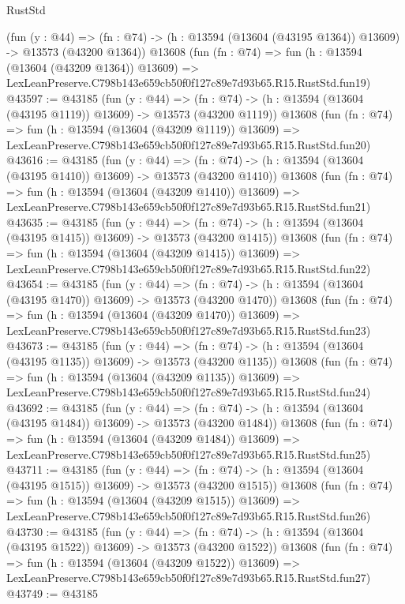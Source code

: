 \begin{lexlean}{RustStd}
\begin{coremodule}
    (fun (y : @44) =>
    (fn : @74) -> (h : @13594 (@13604 (@43195 @1364)) @13609) -> @13573 (@43200 @1364))
    @13608
    (fun (fn : @74) =>
    fun (h : @13594 (@13604 (@43209 @1364)) @13609) =>
    LexLeanPreserve.C798b143e659cb50f0f127c89e7d93b65.R15.RustStd.fun19)
@43597 := @43185
    (fun (y : @44) =>
    (fn : @74) -> (h : @13594 (@13604 (@43195 @1119)) @13609) -> @13573 (@43200 @1119))
    @13608
    (fun (fn : @74) =>
    fun (h : @13594 (@13604 (@43209 @1119)) @13609) =>
    LexLeanPreserve.C798b143e659cb50f0f127c89e7d93b65.R15.RustStd.fun20)
@43616 := @43185
    (fun (y : @44) =>
    (fn : @74) -> (h : @13594 (@13604 (@43195 @1410)) @13609) -> @13573 (@43200 @1410))
    @13608
    (fun (fn : @74) =>
    fun (h : @13594 (@13604 (@43209 @1410)) @13609) =>
    LexLeanPreserve.C798b143e659cb50f0f127c89e7d93b65.R15.RustStd.fun21)
@43635 := @43185
    (fun (y : @44) =>
    (fn : @74) -> (h : @13594 (@13604 (@43195 @1415)) @13609) -> @13573 (@43200 @1415))
    @13608
    (fun (fn : @74) =>
    fun (h : @13594 (@13604 (@43209 @1415)) @13609) =>
    LexLeanPreserve.C798b143e659cb50f0f127c89e7d93b65.R15.RustStd.fun22)
@43654 := @43185
    (fun (y : @44) =>
    (fn : @74) -> (h : @13594 (@13604 (@43195 @1470)) @13609) -> @13573 (@43200 @1470))
    @13608
    (fun (fn : @74) =>
    fun (h : @13594 (@13604 (@43209 @1470)) @13609) =>
    LexLeanPreserve.C798b143e659cb50f0f127c89e7d93b65.R15.RustStd.fun23)
@43673 := @43185
    (fun (y : @44) =>
    (fn : @74) -> (h : @13594 (@13604 (@43195 @1135)) @13609) -> @13573 (@43200 @1135))
    @13608
    (fun (fn : @74) =>
    fun (h : @13594 (@13604 (@43209 @1135)) @13609) =>
    LexLeanPreserve.C798b143e659cb50f0f127c89e7d93b65.R15.RustStd.fun24)
@43692 := @43185
    (fun (y : @44) =>
    (fn : @74) -> (h : @13594 (@13604 (@43195 @1484)) @13609) -> @13573 (@43200 @1484))
    @13608
    (fun (fn : @74) =>
    fun (h : @13594 (@13604 (@43209 @1484)) @13609) =>
    LexLeanPreserve.C798b143e659cb50f0f127c89e7d93b65.R15.RustStd.fun25)
@43711 := @43185
    (fun (y : @44) =>
    (fn : @74) -> (h : @13594 (@13604 (@43195 @1515)) @13609) -> @13573 (@43200 @1515))
    @13608
    (fun (fn : @74) =>
    fun (h : @13594 (@13604 (@43209 @1515)) @13609) =>
    LexLeanPreserve.C798b143e659cb50f0f127c89e7d93b65.R15.RustStd.fun26)
@43730 := @43185
    (fun (y : @44) =>
    (fn : @74) -> (h : @13594 (@13604 (@43195 @1522)) @13609) -> @13573 (@43200 @1522))
    @13608
    (fun (fn : @74) =>
    fun (h : @13594 (@13604 (@43209 @1522)) @13609) =>
    LexLeanPreserve.C798b143e659cb50f0f127c89e7d93b65.R15.RustStd.fun27)
@43749 := @43185

\end{coremodule}
\end{lexlean}

